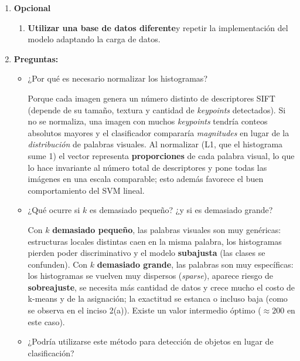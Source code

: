 \documentclass{article}
\begin{document}
\begin{enumerate}
\begin{enumerate}
    \end{enumerate}

\item \textbf{Opcional}
    \begin{enumerate}
        \item \textbf{Utilizar una base de datos diferente}y repetir la implementación del modelo adaptando la carga de datos.
    \end{enumerate}

\item \textbf{Preguntas:}

    \begin{itemize}
        \item ¿Por qué es necesario normalizar los histogramas?

        Porque cada imagen genera un número distinto de descriptores SIFT (depende de su
        tamaño, textura y cantidad de \textit{keypoints} detectados). Si no se normaliza, una
        imagen con muchos \textit{keypoints} tendría conteos absolutos mayores y el
        clasificador compararía \textit{magnitudes} en lugar de la \textit{distribución} de
        palabras visuales. Al normalizar (L1, que el histograma sume 1) el vector representa
        \textbf{proporciones} de cada palabra visual, lo que lo hace invariante al número
        total de descriptores y pone todas las imágenes en una escala comparable; esto además
        favorece el buen comportamiento del SVM lineal.

        \item ¿Qué ocurre si $k$ es demasiado pequeño? ¿y si es demasiado grande?

        Con $k$ \textbf{demasiado pequeño}, las palabras visuales son muy genéricas:
        estructuras locales distintas caen en la misma palabra, los histogramas pierden poder
        discriminativo y el modelo \textbf{subajusta} (las clases se confunden). Con $k$
        \textbf{demasiado grande}, las palabras son muy específicas: los histogramas se
        vuelven muy dispersos (\textit{sparse}), aparece riesgo de \textbf{sobreajuste}, se
        necesita más cantidad de datos y crece mucho el costo de k-means y de la asignación;
        la exactitud se estanca o incluso baja (como se observa en el inciso 2(a)). Existe un
        valor intermedio óptimo ($\approx 200$ en este caso).

        \item ¿Podría utilizarse este método para detección de objetos en lugar de clasificación?


\end{itemize}
\end{enumerate}
\end{document}
